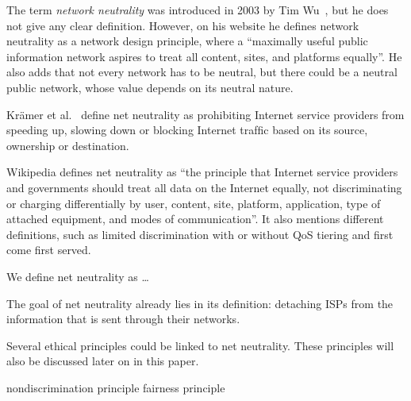 
The term \emph{network neutrality} was introduced in 2003 by Tim Wu~\cite{wu2003network}, but he does not give any clear definition. However, on his website \highlight{[cite]} he defines network neutrality as a network design principle, where a ``maximally useful public information network aspires to treat all content, sites, and platforms equally''. He also adds that not every network has to be neutral, but there could be a neutral public network, whose value depends on its neutral nature.

Kr\"amer et al.~\cite{kramer2013net} define net neutrality as prohibiting Internet service providers from speeding up, slowing down or blocking Internet trafﬁc based on its source, ownership or destination.

Wikipedia \highlight{[cite]} defines net neutrality as ``the principle that Internet service providers and governments should treat all data on the Internet equally, not discriminating or charging differentially by user, content, site, platform, application, type of attached equipment, and modes of communication''. It also mentions different definitions, such as limited discrimination with or without \ac{QoS} tiering and first come first served.

We define net neutrality as \ldots

The goal of net neutrality already lies in its definition: detaching \acp{ISP} from the information that is sent through their networks.

Several ethical principles could be linked to net neutrality. These principles will also be discussed later on in this paper.

 nondiscrimination principle
 fairness principle
